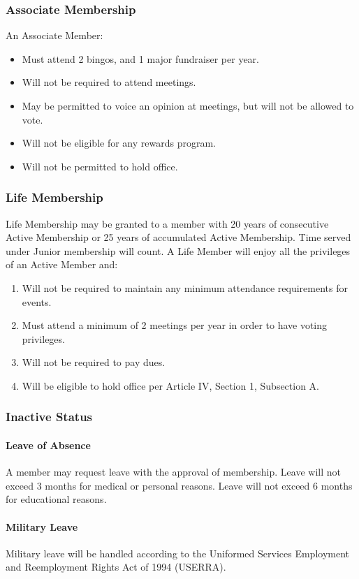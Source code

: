 ﻿\documentclass[12pt,letterpaper]{article}
\begin{document}
\subsubsection{Associate Membership}
An Associate Member:
\begin{itemize}
\item Must attend 2 bingos, and 1 major fundraiser per year.
\item Will not be required to attend meetings.
\item May be permitted to voice an opinion at meetings, but will not be allowed to vote.
\item Will not be eligible for any rewards program.
\item Will not be permitted to hold office.
\end{itemize}

\subsubsection{Life Membership}
Life Membership may be granted to a member with 20 years of consecutive Active Membership or 25 years of accumulated Active Membership.  Time served under Junior membership will count.  A Life Member will enjoy all the privileges of an Active Member and:
\begin{enumerate}
\item Will not be required to maintain any minimum attendance requirements for events.
\item Must attend a minimum of 2 meetings per year in order to have voting privileges.
\item Will not be required to pay dues.
\item Will be eligible to hold office per Article IV, Section 1, Subsection A.
\end{enumerate}

\subsubsection{Inactive Status}
\paragraph{Leave of Absence}
A member may request leave with the approval of membership.  Leave will not exceed 3 months for medical or personal reasons.  Leave will not exceed 6 months for educational reasons. 
\paragraph{Military Leave}
Military leave will be handled according to the Uniformed Services Employment and Reemployment Rights Act of 1994 (USERRA).
\end{document}
